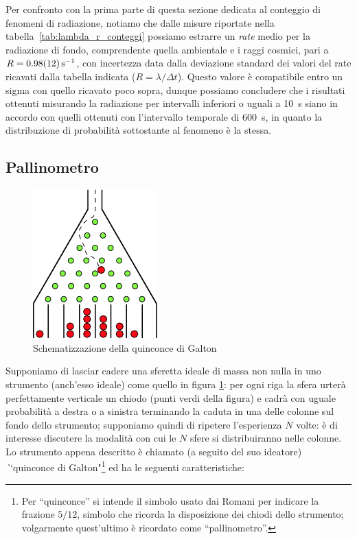 \documentclass[10pt,oneside,a4paper]{article}
\begin{document}
Per confronto con la prima parte di questa sezione dedicata al conteggio di fenomeni di radiazione, notiamo che dalle misure riportate nella tabella~\ref{tab:lambda_r_conteggi} possiamo estrarre un \emph{rate} medio per la radiazione di fondo, comprendente quella ambientale e i raggi cosmici, pari a $R = \SI{0.98 \pm 0.12}{s^{-1}}$, con incertezza data dalla deviazione standard dei valori del rate ricavati dalla tabella indicata ($R = \lambda / \Delta t$). Questo valore è compatibile entro un sigma con quello ricavato poco sopra, dunque possiamo concludere che i risultati ottenuti misurando la radiazione per intervalli inferiori o uguali a \SI{10}{s} siano in accordo con quelli ottenuti con l'intervallo temporale di \SI{600}{s}, in quanto la distribuzione di probabilità sottostante al fenomeno è la stessa.


\subsection{Pallinometro}\label{sec:pallinometro}
\begin{figure}[h]
\centering
\includegraphics{pallinometro.png}
\caption{Schematizzazione della quinconce di Galton}
\label{fig:pallinometro}
\end{figure}
Supponiamo di lasciar cadere una sferetta ideale di massa non nulla in uno strumento (anch'esso ideale) come quello in figura \ref{fig:pallinometro}: per ogni riga la sfera urterà perfettamente verticale un chiodo (punti verdi della figura) e cadrà con uguale probabilità a destra o a sinistra terminando la caduta in una delle colonne sul fondo dello strumento; supponiamo quindi di ripetere l'esperienza $N$ volte: è di interesse discutere la modalità con cui le $N$ sfere si distribuiranno nelle colonne. Lo strumento appena descritto è chiamato (a seguito del suo ideatore) \emph ``quinconce di Galton"\footnote{Per ``quinconce'' si intende il simbolo usato dai Romani per indicare la frazione $5/12$, simbolo che ricorda la disposizione dei chiodi dello strumento; volgarmente quest'ultimo è ricordato come ``pallinometro''.} ed ha le seguenti caratteristiche:
\end{document}
